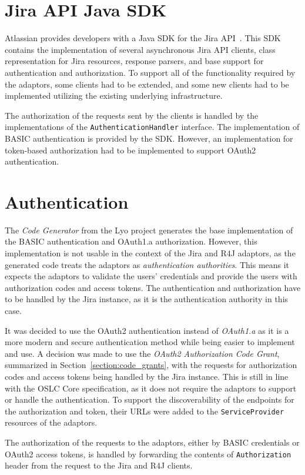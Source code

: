 \section{Jira API Java SDK}
Atlassian provides developers with a Java SDK for the Jira API \cite{jira_java_sdk}. This SDK contains the implementation of several asynchronous Jira API clients, class representation for Jira resources, response parsers, and base support for authentication and authorization. To support all of the functionality required by the adaptors, some clients had to be extended, and some new clients had to be implemented utilizing the existing underlying infrastructure.

The authorization of the requests sent by the clients is handled by the implementations of the \texttt{AuthenticationHandler} interface. The implementation of BASIC authentication is provided by the SDK. However, an implementation for token-based authorization had to be implemented to support OAuth2 authentication.

\section{Authentication}
The \emph{Code Generator} from the Lyo project generates the base implementation of the BASIC authentication and OAuth1.a authorization. However, this implementation is not usable in the context of the Jira and R4J adaptors, as the generated code treats the adaptors as \emph{authentication authorities}. This means it expects the adaptors to validate the users' credentials and provide the users with authorization codes and access tokens. The authentication and authorization have to be handled by the Jira instance, as it is the authentication authority in this case.

It was decided to use the OAuth2 authentication instead of \emph{OAuth1.a} as it is a more modern and secure authentication method while being easier to implement and use. A decision was made to use the \emph{OAuth2 Authorization Code Grant}, summarized in Section \ref{section:code_grants}, with the requests for authorization codes and access tokens being handled by the Jira instance. This is still in line with the OSLC Core specification, as it does not require the adaptors to support or handle the authentication. To support the discoverability of the endpoints for the authorization and token, their URLs were added to the \texttt{ServiceProvider} resources of the adaptors.

The authorization of the requests to the adaptors, either by BASIC credentials or OAuth2 access tokens, is handled by forwarding the contents of \texttt{Authorization} header from the request to the Jira and R4J clients.

